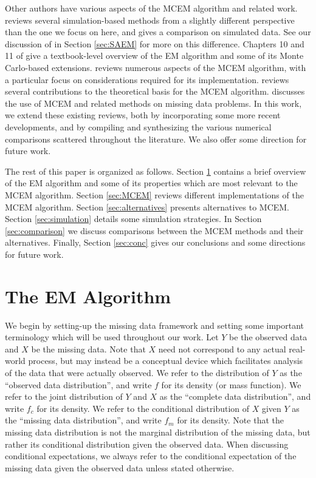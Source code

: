\documentclass[11pt, oneside]{article}   	%
\begin{document}
Other authors have various aspects of the MCEM algorithm and related work. \citet{Cel95} reviews several simulation-based methods from a slightly different perspective than the one we focus on here, and gives a comparison on simulated data. See our discussion of \citet{Cel95} in Section \ref{sec:SAEM} for more on this difference. Chapters 10 and 11 of \citet{Cap05} give a textbook-level overview of the EM algorithm and some of its Monte Carlo-based extensions. \citet{Jan06II} reviews numerous aspects of the MCEM algorithm, with a particular focus on considerations required for its implementation. \citet{Nea13} reviews several contributions to the theoretical basis for the MCEM algorithm. \citet{Zho20} discusses the use of MCEM and related methods on missing data problems. In this work, we extend these existing reviews, both by incorporating some more recent developments, and by compiling and synthesizing the various numerical comparisons scattered throughout the literature. We also offer some direction for future work.

The rest of this paper is organized as follows. Section \ref{sec:EM} contains a brief overview of the EM algorithm and some of its properties which are most relevant to the MCEM algorithm. Section \ref{sec:MCEM} reviews different implementations of the MCEM algorithm. Section \ref{sec:alternatives} presents alternatives to MCEM. Section \ref{sec:simulation} details some simulation strategies. In Section \ref{sec:comparison} we discuss comparisons between the MCEM methods and their alternatives. Finally, Section \ref{sec:conc} gives our conclusions and some directions for future work.



\section{The EM Algorithm}
\label{sec:EM}

We begin by setting-up the missing data framework and setting some important terminology which will be used throughout our work. Let $Y$ be the observed data and $X$ be the missing data. Note that $X$ need not correspond to any actual real-world process, but may instead be a conceptual device which facilitates analysis of the data that were actually observed. We refer to the distribution of $Y$ as the ``observed data distribution'', and write $f$ for its density (or mass function). We refer to the joint distribution of $Y$ and $X$ as the ``complete data distribution'', and write $f_c$ for its density. We refer to the conditional distribution of $X$ given $Y$ as the ``missing data distribution'', and write $f_m$ for its density. Note that the missing data distribution is not the marginal distribution of the missing data, but rather its conditional distribution given the observed data. When discussing conditional expectations, we always refer to the conditional expectation of the missing data given the observed data unless stated otherwise.
\end{document}
